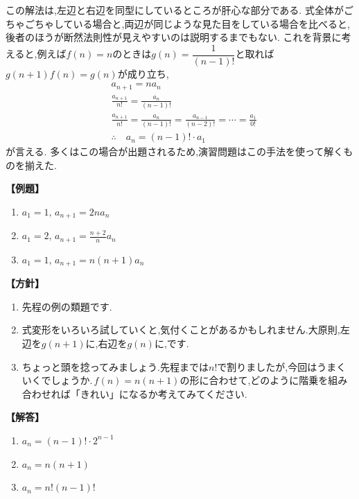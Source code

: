     この解法は,左辺と右辺を同型にしているところが肝心な部分である.
    式全体がごちゃごちゃしている場合と,両辺が同じような見た目をしている場合を比べると,後者のほうが断然法則性が見えやすいのは説明するまでもない.
    これを背景に考えると,例えば$f(n)=n$のときは$g(n)=\dfrac1{(n-1)!}$と取れば$g(n+1)f(n)=g(n)$が成り立ち,
    \begin{align*}
      &a_{n+1}=na_n\\
      &\frac{a_{n+1}}{n!}=\frac{a_n}{(n-1)!}\\
      &\frac{a_{n+1}}{n!}=\frac{a_n}{(n-1)!}=\frac{a_{n-1}}{(n-2)!}=\cdots=\frac{a_1}{0!}\\
      &\therefore \quad a_n=(n-1)!\cdot a_1
    \end{align*}
    が言える.
    多くはこの場合が出題されるため,演習問題はこの手法を使って解くものを揃えた.
    
    \noindent \textbf{【例題】}
    \begin{enumerate}[label=(\arabic*),parsep=3pt]
      \item $\displaystyle a_1=1,\, a_{n+1}=2na_n$
      \item $\displaystyle a_1=2,\, a_{n+1}=\frac{n+2}{n}a_n$
      \item $\displaystyle a_1=1,\, a_{n+1}=n(n+1)a_n$
    \end{enumerate}

    \noindent\textbf{【方針】}
    \begin{enumerate}[label=(\arabic*),parsep=3pt]
      \item 先程の例の類題です.
      \item 式変形をいろいろ試していくと,気付くことがあるかもしれません.大原則,左辺を$g(n+1)$に,右辺を$g(n)$に,です.
      \item ちょっと頭を捻ってみましょう.先程までは$n!$で割りましたが,今回はうまくいくでしょうか.\,$f(n)=n(n+1)$の形に合わせて,どのように階乗を組み合わせれば「きれい」になるか考えてみてください.
    \end{enumerate}

    \noindent\textbf{【解答】}
    \begin{enumerate}[label=(\arabic*),parsep=3pt]
      \item $\displaystyle a_n=(n-1)!\cdot 2^{n-1}$
      \item $\displaystyle a_n=n(n+1)$
      \item $\displaystyle a_n=n!(n-1)!$
    \end{enumerate}

